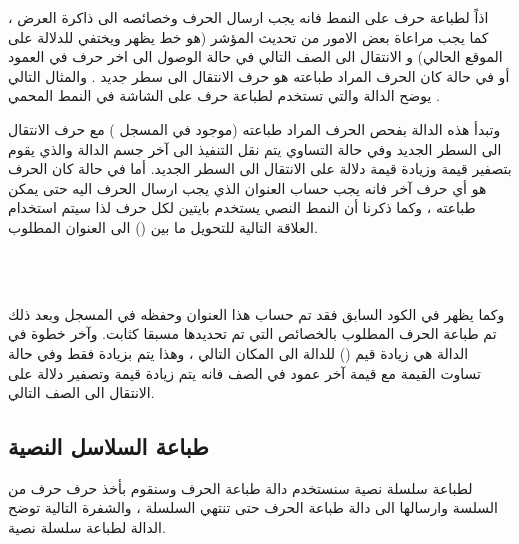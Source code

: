 \documentclass[document.tex]{subfiles}
\begin{document}
اذاً لطباعة حرف على النمط  فانه يجب ارسال الحرف وخصائصه الى ذاكرة العرض ، كما يجب مراعاة بعض الامور من تحديث المؤشر  (هو خط   يظهر ويختفي للدلالة على الموقع الحالي) و الانتقال الى الصف التالي في حالة الوصول الى اخر حرف في العمود أو في حالة كان الحرف المراد طباعته هو حرف الانتقال الى سطر جديد  . والمثال التالي يوضح الدالة  والتي تستخدم لطباعة حرف على الشاشة في النمط المحمي .

\begin{english}
\lstset{numberstyle=\tiny,numbersep=5pt,tabsize=2,extendedchars=true,breaklines=true,frame=b,showspaces=false, showtabs=false,xleftmargin=10pt,framexleftmargin=10pt,framexrightmargin=5pt,framexbottommargin=4pt,showstringspaces=false,language=[x86masm]Assembler}


\end{english}

وتبدأ هذه الدالة بفحص الحرف المراد طباعته (موجود في المسجل ) مع حرف الانتقال الى السطر الجديد  وفي حالة التساوي يتم نقل التنفيذ الى آخر جسم الدالة والذي يقوم بتصفير قيمة  وزيادة قيمة  دلالة على الانتقال الى السطر الجديد. أما في حالة كان الحرف هو أي حرف آخر فانه يجب حساب العنوان الذي يجب ارسال الحرف اليه حتى يمكن طباعته ، وكما ذكرنا أن النمط النصي  يستخدم بايتين لكل حرف لذا سيتم استخدام العلاقة التالية للتحويل ما بين () الى العنوان المطلوب.

\begin{english}
\\
\\
\end{english}

وكما يظهر في الكود السابق فقد تم حساب هذا العنوان وحفظه في المسجل   وبعد ذلك تم طباعة الحرف المطلوب بالخصائص التي تم تحديدها مسبقا كثابت. وآخر خطوة في الدالة هي زيادة قيم () للدالة الى المكان التالي ، وهذا يتم بزيادة  فقط وفي حالة تساوت القيمة مع قيمة آخر عمود في الصف فانه يتم زيادة قيمة  وتصفير  دلالة على الانتقال الى الصف التالي.

\subsection{طباعة السلاسل النصية }
لطباعة سلسلة نصية سنستخدم دالة طباعة الحرف وسنقوم بأخذ حرف حرف من السلسة وارسالها الى دالة طباعة الحرف حتى تنتهي السلسلة ، والشفرة التالية توضح الدالة  لطباعة سلسلة نصية.
\end{document}
